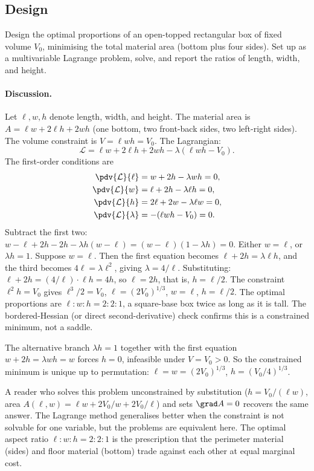 \subsection*{Design}

\begin{exercise}
Design the optimal proportions of an open-topped rectangular box
of fixed volume $V_{0}$, minimising the total material area
(bottom plus four sides). Set up as a multivariable Lagrange
problem, solve, and report the ratios of length, width, and height.

\paragraph{Discussion.} Let $\ell, w, h$ denote length, width, and
height. The material area is $A = \ell w + 2 \ell h + 2 w h$ (one
bottom, two front-back sides, two left-right sides). The volume
constraint is $V = \ell w h = V_{0}$. The Lagrangian:
\[
\mathcal{L} = \ell w + 2\ell h + 2 w h - \lambda (\ell w h - V_{0}).
\]
The first-order conditions are
\begin{align*}
\pdv{\mathcal{L}}{\ell} &= w + 2 h - \lambda w h = 0, \\
\pdv{\mathcal{L}}{w} &= \ell + 2 h - \lambda \ell h = 0, \\
\pdv{\mathcal{L}}{h} &= 2\ell + 2 w - \lambda \ell w = 0, \\
\pdv{\mathcal{L}}{\lambda} &= -(\ell w h - V_{0}) = 0.
\end{align*}
Subtract the first two: $w - \ell + 2 h - 2 h - \lambda h(w - \ell)
= (w - \ell)(1 - \lambda h) = 0$. Either $w = \ell$, or $\lambda h
= 1$. Suppose $w = \ell$. Then the first equation becomes $\ell + 2
h = \lambda \ell h$, and the third becomes $4\ell = \lambda \ell^{2}$,
giving $\lambda = 4/\ell$. Substituting: $\ell + 2 h = (4/\ell)
\cdot \ell h = 4 h$, so $\ell = 2 h$, that is, $h = \ell/2$. The
constraint $\ell^{2} h = V_{0}$ gives $\ell^{3}/2 = V_{0}$, $\ell =
(2 V_{0})^{1/3}$, $w = \ell$, $h = \ell/2$. The optimal proportions
are $\ell : w : h = 2 : 2 : 1$, a square-base box twice as long as
it is tall. The bordered-Hessian (or direct second-derivative)
check confirms this is a constrained minimum, not a saddle.

The alternative branch $\lambda h = 1$ together with the first
equation $w + 2h = \lambda w h = w$ forces $h = 0$, infeasible
under $V = V_{0} > 0$. So the constrained minimum is unique up to
permutation: $\ell = w = (2 V_{0})^{1/3}$, $h = (V_{0}/4)^{1/3}$.

A reader who solves this problem unconstrained by substitution
($h = V_{0}/(\ell w)$, area $A(\ell, w) = \ell w + 2 V_{0}/w +
2 V_{0}/\ell$) and sets $\grad A = 0$ recovers the same answer.
The Lagrange method generalises better when the constraint is not
solvable for one variable, but the problems are equivalent here.
The optimal aspect ratio $\ell : w : h = 2 : 2 : 1$ is the
prescription that the perimeter material (sides) and floor material
(bottom) trade against each other at equal marginal cost.
\end{exercise}

